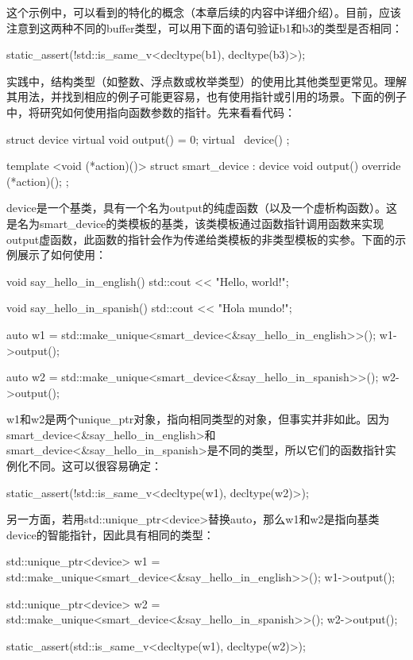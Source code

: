 这个示例中，可以看到的特化的概念（本章后续的内容中详细介绍）。目前，应该注意到这两种不同的buffer类型，可以用下面的语句验证b1和b3的类型是否相同：

\begin{cpp}
static_assert(!std::is_same_v<decltype(b1), decltype(b3)>);
\end{cpp}

实践中，结构类型（如整数、浮点数或枚举类型）的使用比其他类型更常见。理解其用法，并找到相应的例子可能更容易，也有使用指针或引用的场景。下面的例子中，将研究如何使用指向函数参数的指针。先来看看代码：

\begin{cpp}
struct device
{
	virtual void output() = 0;
	virtual ~device() {}
};

template <void (*action)()>
struct smart_device : device
{
	void output() override
	{
		(*action)();
	}
};
\end{cpp}

device是一个基类，具有一个名为output的纯虚函数（以及一个虚析构函数）。这是名为smart\_device的类模板的基类，该类模板通过函数指针调用函数来实现output虚函数，此函数的指针会作为传递给类模板的非类型模板的实参。下面的示例展示了如何使用：

\begin{cpp}
void say_hello_in_english()
{
	std::cout << "Hello, world!\n";
}

void say_hello_in_spanish()
{
	std::cout << "Hola mundo!\n";
}

auto w1 =
	std::make_unique<smart_device<&say_hello_in_english>>();
w1->output();

auto w2 =
	std::make_unique<smart_device<&say_hello_in_spanish>>();
w2->output();
\end{cpp}

w1和w2是两个unique\_ptr对象，指向相同类型的对象，但事实并非如此。因为smart\_device<\&say\_hello\_in\_english>和smart\_device<\&say\_hello\_in\_spanish>是不同的类型，所以它们的函数指针实例化不同。这可以很容易确定：

\begin{cpp}
static_assert(!std::is_same_v<decltype(w1), decltype(w2)>);
\end{cpp}

另一方面，若用std::unique\_ptr<device>替换auto，那么w1和w2是指向基类device的智能指针，因此具有相同的类型：

\begin{cpp}
std::unique_ptr<device> w1 =
	std::make_unique<smart_device<&say_hello_in_english>>();
w1->output();

std::unique_ptr<device> w2 =
	std::make_unique<smart_device<&say_hello_in_spanish>>();
w2->output();

static_assert(std::is_same_v<decltype(w1), decltype(w2)>);
\end{cpp}

